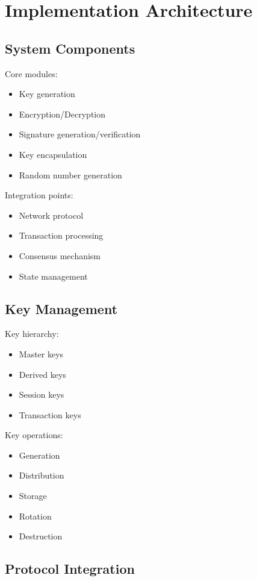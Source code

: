 \documentclass[12pt]{article}
\begin{document}
\section{Implementation Architecture}

\subsection{System Components}

Core modules:

\begin{itemize}
\item Key generation
\item Encryption/Decryption
\item Signature generation/verification
\item Key encapsulation
\item Random number generation
\end{itemize}

Integration points:
\begin{itemize}
\item Network protocol
\item Transaction processing
\item Consensus mechanism
\item State management
\end{itemize}

\subsection{Key Management}

Key hierarchy:
\begin{itemize}
\item Master keys
\item Derived keys
\item Session keys
\item Transaction keys
\end{itemize}

Key operations:
\begin{itemize}
\item Generation
\item Distribution
\item Storage
\item Rotation
\item Destruction
\end{itemize}

\subsection{Protocol Integration}
\end{document}
